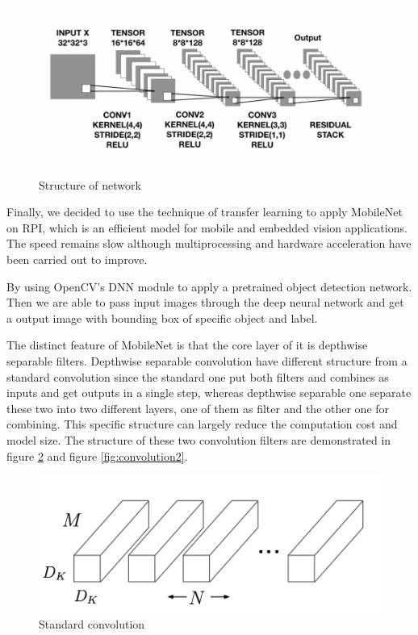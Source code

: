 \documentclass[11pt, titlepage]{article} %
\begin{document}
\begin{figure}[]
	\centering
   	\includegraphics[scale=0.6]{network.png}
   	\caption{Structure of network}
   	\label{fig:network}
\end{figure}

Finally, we decided to use the technique of transfer learning to apply MobileNet on RPI, which is an efficient model for mobile and embedded vision applications. The speed remains slow although multiprocessing and hardware acceleration have been carried out to improve.

By using OpenCV’s DNN module to apply a pretrained object detection network. Then we are able to pass input images through the deep neural network and get a output image with bounding box of specific object and label.

The distinct feature of MobileNet is that the core layer of it is depthwise separable filters. Depthwise separable convolution have different structure from a standard convolution since the standard one put both filters and combines as inputs and get outputs in a single step, whereas depthwise separable one separate these two into two different layers, one of them as filter and the other one for combining. This specific structure can largely reduce the computation cost and model size. The structure of these two convolution filters are demonstrated in figure \ref{fig:convolution1} and figure \ref{fig:convolution2}.

\begin{figure}[]
	\centering
   	\includegraphics[scale=0.5]{convolution1.png}
   	\caption{Standard convolution}
   	\label{fig:convolution1}
\end{figure}
\end{document}
